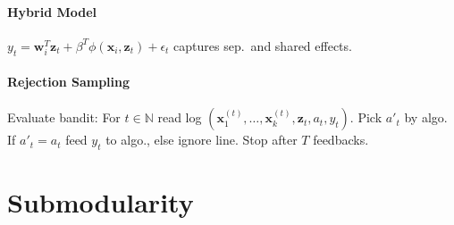 \documentclass[9pt]{scrartcl}
\newcommand{\eps}{\epsilon}
\newcommand{\N}{\mathbb{N}}
\begin{document}
\begin{twocolumn}

\paragraph{Hybrid Model}
$y_t = \bm w_i^T \bm z_t + \beta^T \phi(\bm x_i,\bm z_t) + \eps_t$
captures sep.\ and shared effects.

\paragraph{Rejection Sampling}
Evaluate bandit: For $t \in \N$ read log $(\bm x_1^{(t)},\dots,\bm x_k^{(t)},\bm z_t,a_t,y_t)$.
Pick $a'_t$ by algo. If $a'_t = a_t$ feed $y_t$ to algo., else ignore line. Stop after $T$ feedbacks.


\section{Submodularity}

\end{twocolumn}

\appendix
\end{document}
